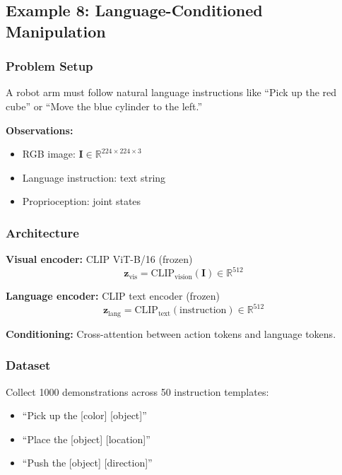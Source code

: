 \subsection{Example 8: Language-Conditioned Manipulation}
\label{subsec:example_language}

\subsubsection{Problem Setup}

A robot arm must follow natural language instructions like ``Pick up the red cube'' or ``Move the blue cylinder to the left.''

\textbf{Observations:}
\begin{itemize}
    \item RGB image: $\mathbf{I} \in \mathbb{R}^{224 \times 224 \times 3}$
    \item Language instruction: text string
    \item Proprioception: joint states
\end{itemize}

\subsubsection{Architecture}

\textbf{Visual encoder:} CLIP ViT-B/16 (frozen)
\begin{equation}
\mathbf{z}_{\text{vis}} = \text{CLIP}_{\text{vision}}(\mathbf{I}) \in \mathbb{R}^{512}
\label{eq:clip_visual}
\end{equation}

\textbf{Language encoder:} CLIP text encoder (frozen)
\begin{equation}
\mathbf{z}_{\text{lang}} = \text{CLIP}_{\text{text}}(\text{instruction}) \in \mathbb{R}^{512}
\label{eq:clip_text}
\end{equation}

\textbf{Conditioning:} Cross-attention between action tokens and language tokens.

\subsubsection{Dataset}

Collect 1000 demonstrations across 50 instruction templates:
\begin{itemize}
    \item ``Pick up the [color] [object]''
    \item ``Place the [object] [location]''
    \item ``Push the [object] [direction]''
\end{itemize}

